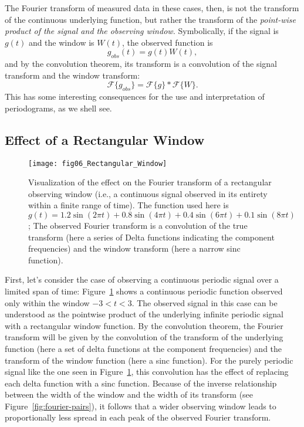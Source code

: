 \documentclass[preprint]{aastex}
\newcommand{\Fig}[1]{Figure~\ref{fig:#1}}
\newcommand{\fig}[1]{Figure~\ref{fig:#1}}
\newcommand{\figlabel}[1]{\label{fig:#1}}
\begin{document}
The Fourier transform of measured data in these cases, then, is not the
transform of the continuous underlying function, but rather the transform
of the {\it point-wise product of the signal and the observing window.}
Symbolically, if the signal is $g(t)$ and the window is $W(t)$, the observed
function is
\begin{equation}
  g_{obs}(t) = g(t)W(t),
\end{equation}
and by the convolution theorem, its transform is a convolution
of the signal transform and the window transform:
\begin{equation}
  \mathcal{F}\{g_{obs}\} = \mathcal{F}\{g\} \ast \mathcal{F}\{W\}.
\end{equation}
This has some interesting consequences for the use and interpretation of
periodograms, as we shell see.

\subsection{Effect of a Rectangular Window}

\begin{figure}[ht]
  \centering
  \texttt{[image: fig06\_Rectangular\_Window]}
  \caption{Visualization of the effect on the Fourier transform of a
    rectangular observing window (i.e., a continuous signal observed in its
    entirety within a finite range of time). The function used here is
    $g(t) = 1.2\sin(2\pi t) + 0.8\sin(4\pi t) + 0.4\sin(6\pi t) + 0.1\sin(8\pi t)$; The observed Fourier
    transform is a convolution of the true transform (here a series of Delta
    functions indicating the component frequencies) and the window transform
    (here a narrow sinc function).
    \figlabel{rectangular-window}}
\end{figure}

First, let's consider the case of observing a continuous periodic signal over
a limited span of time: \fig{rectangular-window} shows
a continuous periodic function observed only within the window $-3<t<3$.
The observed signal in this case can be understood as the pointwise product of
the underlying infinite periodic signal with a rectangular window function.
By the convolution theorem, the Fourier transform will be given by the
convolution of the transform of the underlying function (here a set of
delta functions at the component frequencies) and the transform of the window
function (here a sinc function).
For the purely periodic signal like the one seen in \fig{rectangular-window},
this convolution has the effect of replacing each delta function with a
sinc function.
Because of the inverse relationship between the width of the window and the
width of its transform (see \Fig{fourier-pairs}), it follows that a wider
observing window leads to proportionally less spread in each peak of
the observed Fourier transform.
\end{document}
